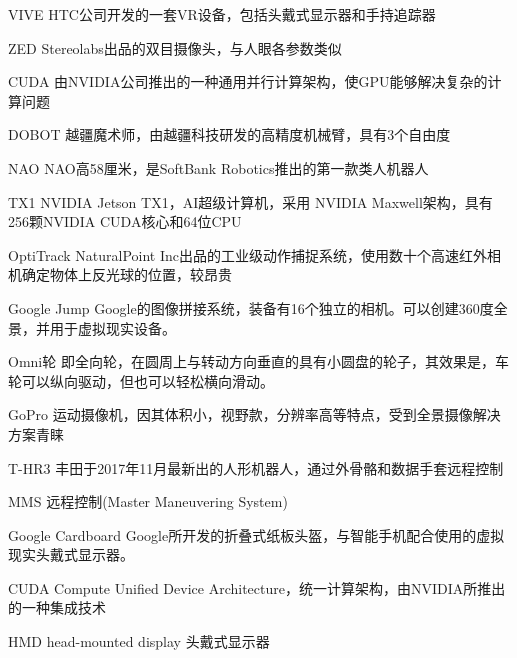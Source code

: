 \begin{denotation}[3cm]
\item[VIVE] HTC公司开发的一套VR设备，包括头戴式显示器和手持追踪器
\item[ZED] Stereolabs出品的双目摄像头，与人眼各参数类似
\item[CUDA] 由NVIDIA公司推出的一种通用并行计算架构，使GPU能够解决复杂的计算问题
\item[DOBOT] 越疆魔术师，由越疆科技研发的高精度机械臂，具有3个自由度
\item[NAO] NAO高58厘米，是SoftBank Robotics推出的第一款类人机器人
\item[TX1]  NVIDIA Jetson TX1，AI超级计算机，采用 NVIDIA Maxwell架构，具有256颗NVIDIA CUDA核心和64位CPU
\item[OptiTrack]  NaturalPoint Inc出品的工业级动作捕捉系统，使用数十个高速红外相机确定物体上反光球的位置，较昂贵
\item[Google Jump] Google的图像拼接系统，装备有16个独立的相机。可以创建360度全景，并用于虚拟现实设备。
\item[Omni轮] 即全向轮，在圆周上与转动方向垂直的具有小圆盘的轮子，其效果是，车轮可以纵向驱动，但也可以轻松横向滑动。
\item[GoPro] 运动摄像机，因其体积小，视野款，分辨率高等特点，受到全景摄像解决方案青睐
\item[T-HR3]丰田于2017年11月最新出的人形机器人，通过外骨骼和数据手套远程控制
\item[MMS]远程控制(Master Maneuvering System)
\item[Google Cardboard] Google所开发的折叠式纸板头盔，与智能手机配合使用的虚拟现实头戴式显示器。
\item[CUDA] Compute Unified Device Architecture，统一计算架构，由NVIDIA所推出的一种集成技术
\item[HMD] head-mounted display 头戴式显示器
\item[]
\item[]



\end{denotation}
